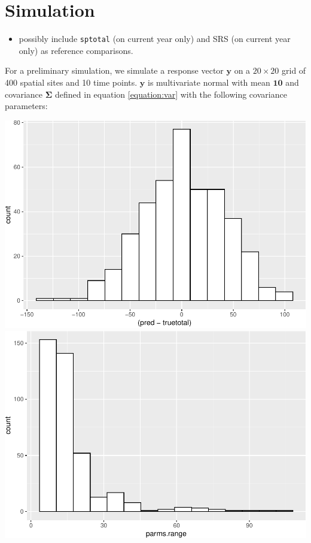 \documentclass[]{interact}
\theoremstyle{plain}%
\theoremstyle{definition}
\theoremstyle{remark}
\def\tightlist{}
\begin{document}
\section{Simulation} \label{section:Simulation}

\begin{itemize}
\tightlist
\item
  possibly include \texttt{sptotal} (on current year only) and SRS (on
  current year only) as reference comparisons.
\end{itemize}

For a preliminary simulation, we simulate a response vector
\(\mathbf{y}\) on a \(20 \times 20\) grid of 400 spatial sites and 10
time points. \(\mathbf{y}\) is multivariate normal with mean
\(\mathbf{10}\) and covariance \(\bm{\Sigma}\) defined in equation
\ref{equation:var} with the following covariance parameters:

\includegraphics{fpspatiotemp_manu_files/figure-latex/unnamed-chunk-24-1.pdf}
\includegraphics{fpspatiotemp_manu_files/figure-latex/unnamed-chunk-24-2.pdf}
\end{document}
